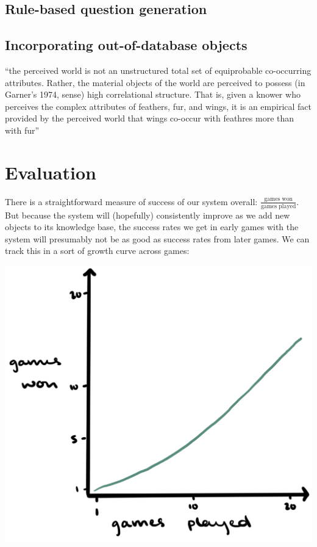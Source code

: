 \documentclass[11pt,a4paper]{article}
\begin{document}
\subsection{Rule-based question generation}

\lipsum[1]


\subsection{Incorporating out-of-database objects}

\lipsum[1]

``the perceived world is not an unstructured total set of equiprobable co-occurring attributes. Rather, the material objects of the world are perceived to possess (in Garner's 1974, sense) high correlational structure.
That is, given a knower who perceives the complex attributes of feathers, fur, and wings, it is an empirical fact provided by the perceived world that wings co-occur with feathres more than with fur'' \citep[29]{Rosch1978}

\section{Evaluation}

There is a straightforward measure of success of our system overall: $\frac{\text{games won}}{\text{games played}}$.
But because the system will (hopefully) consistently improve as we add new objects to its knowledge base, the success rates we get in early games with the system will presumably not be as good as success rates from later games. 
We can track this in a sort of growth curve across games:

\begin{center}
	\includegraphics[width=.5\linewidth]{growth-curve.png}
\end{center}
\end{document}
